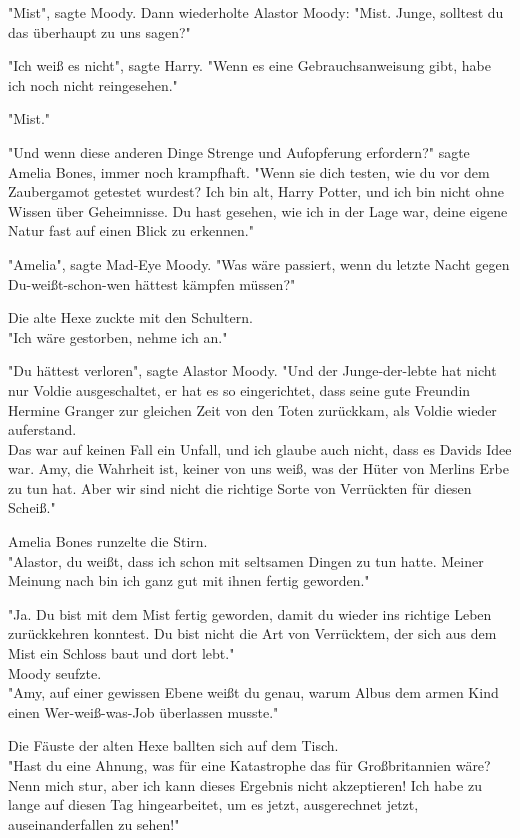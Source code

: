 {"Mist", sagte Moody. Dann wiederholte Alastor Moody: "Mist. Junge, solltest du das überhaupt zu uns sagen?"

"Ich weiß es nicht", sagte Harry. "Wenn es eine Gebrauchsanweisung gibt, habe ich noch nicht reingesehen."

"Mist."

"Und wenn diese anderen Dinge Strenge und Aufopferung erfordern?" sagte Amelia Bones, immer noch krampfhaft. "Wenn sie dich testen, wie du vor dem Zaubergamot getestet wurdest? Ich bin alt, Harry Potter, und ich bin nicht ohne Wissen über Geheimnisse. Du hast gesehen, wie ich in der Lage war, deine eigene Natur fast auf einen Blick zu erkennen."

"Amelia", sagte Mad-Eye Moody. "Was wäre passiert, wenn du letzte Nacht gegen Du-weißt-schon-wen hättest kämpfen müssen?"

Die alte Hexe zuckte mit den Schultern.\\ "Ich wäre gestorben, nehme ich an."

"Du hättest verloren", sagte Alastor Moody. "Und der Junge-der-lebte hat nicht nur Voldie ausgeschaltet, er hat es so eingerichtet, dass seine gute Freundin Hermine Granger zur gleichen Zeit von den Toten zurückkam, als Voldie wieder auferstand.\\ Das war auf keinen Fall ein Unfall, und ich glaube auch nicht, dass es Davids Idee war. Amy, die Wahrheit ist, keiner von uns weiß, was der Hüter von Merlins Erbe zu tun hat. Aber wir sind nicht die richtige Sorte von Verrückten für diesen Scheiß."

Amelia Bones runzelte die Stirn.\\ "Alastor, du weißt, dass ich schon mit seltsamen Dingen zu tun hatte. Meiner Meinung nach bin ich ganz gut mit ihnen fertig geworden."

"Ja. Du bist mit dem Mist fertig geworden, damit du wieder ins richtige Leben zurückkehren konntest. Du bist nicht die Art von Verrücktem, der sich aus dem Mist ein Schloss baut und dort lebt."\\ Moody seufzte.\\ "Amy, auf einer gewissen Ebene weißt du genau, warum Albus dem armen Kind einen Wer-weiß-was-Job überlassen musste."

Die Fäuste der alten Hexe ballten sich auf dem Tisch.\\ "Hast du eine Ahnung, was für eine Katastrophe das für Großbritannien wäre? Nenn mich stur, aber ich kann dieses Ergebnis nicht akzeptieren! Ich habe zu lange auf diesen Tag hingearbeitet, um es jetzt, ausgerechnet jetzt, auseinanderfallen zu sehen!"

}
